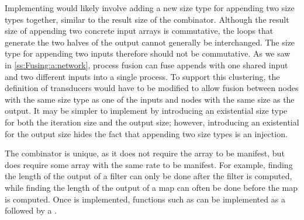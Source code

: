 Implementing \Hs@append@ would likely involve adding a new size type for appending two size types together, similar to the result size of the \Hs@cross@ combinator.
Although the result size of appending two concrete input arrays is commutative, the loops that generate the two halves of the output cannot generally be interchanged.
The size type for appending two inputs therefore should not be commutative.
As we saw in \cref{ss:Fusing:a:network}, process fusion can fuse appends with one shared input and two different inputs into a single process.
To support this clustering, the definition of transducers would have to be modified to allow fusion between nodes with the same size type as one of the inputs and nodes with the same size as the output.
It may be simpler to implement \Hs@append@ by introducing an existential size type for both the iteration size and the output size; however, introducing an existential for the output size hides the fact that appending two size types is an injection.

The \Hs@length@ combinator is unique, as it does not require the array to be manifest, but does require some array with the same rate to be manifest.
For example, finding the length of the output of a filter can only be done after the filter is computed, while finding the length of the output of a map can often be done before the map is computed.
Once \Hs@length@ is implemented, functions such as \Hs@reverse@ can be implemented as a \Hs@generate@ followed by a \Hs@gather@.

% 
 
